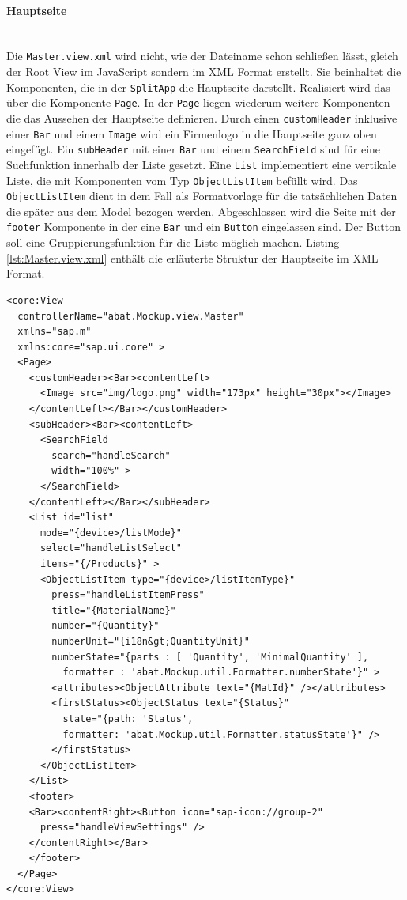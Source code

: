 \paragraph{Hauptseite}$\;$ \\
Die \texttt{Master.view.xml} wird nicht, wie der Dateiname schon schließen lässt, gleich der Root View im JavaScript sondern im XML Format erstellt. Sie beinhaltet die Komponenten, die in der \texttt{SplitApp} die Hauptseite darstellt. Realisiert wird das über die Komponente \texttt{Page}. In der \texttt{Page} liegen wiederum weitere Komponenten die das Aussehen der Hauptseite definieren. Durch einen \texttt{customHeader} inklusive einer \texttt{Bar} und einem \texttt{Image} wird ein Firmenlogo in die Hauptseite ganz oben eingefügt. Ein \texttt{subHeader} mit einer \texttt{Bar} und einem \texttt{SearchField} sind für eine Suchfunktion innerhalb der Liste gesetzt. Eine \texttt{List} implementiert eine vertikale Liste, die mit Komponenten vom Typ \texttt{ObjectListItem} befüllt wird. Das \texttt{ObjectListItem} dient in dem Fall als Formatvorlage für die tatsächlichen Daten die später aus dem Model bezogen werden. Abgeschlossen wird die Seite mit der \texttt{footer} Komponente in der eine \texttt{Bar} und ein \texttt{Button} eingelassen sind. Der Button soll eine Gruppierungsfunktion für die Liste möglich machen. Listing \ref{lst:Master.view.xml} enthält die erläuterte Struktur der Hauptseite im XML Format.

\vspace{1em}
\begin{lstlisting}[language=HTML5, caption=Hauptseite der SplitApp, label=lst:Master.view.xml]
<core:View
  controllerName="abat.Mockup.view.Master"
  xmlns="sap.m"
  xmlns:core="sap.ui.core" >
  <Page>
    <customHeader><Bar><contentLeft>
      <Image src="img/logo.png" width="173px" height="30px"></Image>
    </contentLeft></Bar></customHeader>
    <subHeader><Bar><contentLeft>
      <SearchField
        search="handleSearch"
        width="100%" >
      </SearchField>
    </contentLeft></Bar></subHeader>
    <List id="list"
      mode="{device>/listMode}"
      select="handleListSelect"
      items="{/Products}" >
      <ObjectListItem type="{device>/listItemType}"
        press="handleListItemPress"
        title="{MaterialName}"
        number="{Quantity}"
        numberUnit="{i18n&gt;QuantityUnit}"
        numberState="{parts : [ 'Quantity', 'MinimalQuantity' ],
          formatter : 'abat.Mockup.util.Formatter.numberState'}" >
        <attributes><ObjectAttribute text="{MatId}" /></attributes>
        <firstStatus><ObjectStatus text="{Status}"
          state="{path: 'Status',
          formatter: 'abat.Mockup.util.Formatter.statusState'}" />
        </firstStatus>
      </ObjectListItem>
    </List>
    <footer>
    <Bar><contentRight><Button icon="sap-icon://group-2"
      press="handleViewSettings" />
    </contentRight></Bar>
    </footer>
  </Page>
</core:View>
\end{lstlisting}

